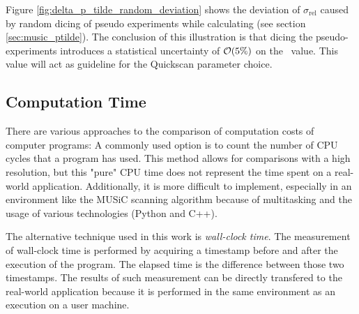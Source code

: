 Figure \ref{fig:delta_p_tilde_random_deviation} shows the deviation of $\sigma_\mathrm{rel}$ caused by random dicing of pseudo experiments while calculating \ptilde (see section \ref{sec:music_ptilde}). The conclusion of this illustration is that dicing the pseudo-experiments introduces a statistical uncertainty of $\order{\unit{5}{\%}}$ on the \ptilde~value. This value will act as guideline for the Quickscan parameter choice.

\subsection{Computation Time}
There are various approaches to the comparison of computation costs of computer programs: A commonly used option is to count the number of CPU cycles that a program has used. This method allows for comparisons with a high resolution, but this "pure" CPU time does not represent the time spent on a real-world application. Additionally, it is more difficult to implement, especially in an environment like the MUSiC scanning algorithm because of multitasking and the usage of various technologies (Python and C++). 

The alternative technique used in this work is \emph{wall-clock time}. The measurement of wall-clock time is performed by acquiring a timestamp before and after the execution of the program. The elapsed time is the difference between those two timestamps. The results of such measurement can be directly transfered to the real-world application because it is performed in the same environment as an execution on a user machine.

